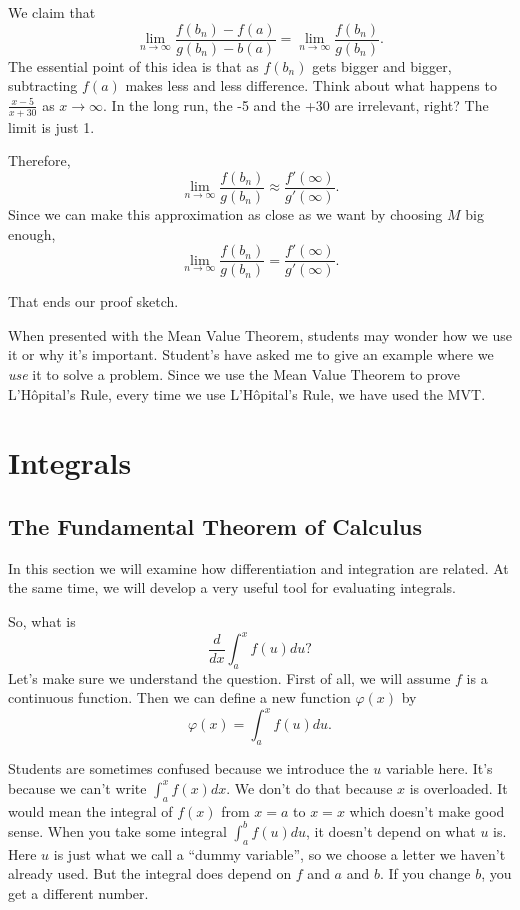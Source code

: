 \documentclass[11pt]{book}
\newcounter{tiein}[chapter]
\numberwithin{example}{chapter}
\begin{document}
We claim that $$\lim_{n\to \infty}\frac{f(b_n)-f(a)}{g(b_n)-b(a)} = \lim_{n\to \infty}\frac{f(b_n)}{g(b_n)}.$$
The essential point of this idea is that as $f(b_n)$ gets bigger and bigger, subtracting $f(a)$ makes less and less difference.  Think about what happens to $\frac{x-5}{x+30}$ as $x\to \infty$.  In the long run, the -5 and the +30 are irrelevant, right?  The limit is just 1. 

Therefore, $$ \lim_{n\to \infty}\frac{f(b_n)}{g(b_n)} \approx \frac{f'(\infty)}{g'(\infty)}.$$  
Since we can make this approximation as close as we want by choosing $M$ big enough, 
$$ \lim_{n\to \infty}\frac{f(b_n)}{g(b_n)} = \frac{f'(\infty)}{g'(\infty)}.$$

That ends our proof sketch.



\begin{tiein}
When presented with the Mean Value Theorem, students may wonder how we use it or why it's important.  Student's have asked me to give an example where we \emph{use} it to solve a problem.  Since we use the Mean Value Theorem to prove L'H\^{o}pital's Rule, every time we use L'H\^{o}pital's Rule, we have used the MVT.  
\end{tiein}

\chapter{Integrals}

\section{The Fundamental Theorem of Calculus}

In this section we will examine how differentiation and integration are related.  At the same time, we will develop a very useful tool for evaluating integrals.

So, what is $$\frac{d}{dx}\int_a^x f(u) du?$$
Let's make sure we understand the question.  First of all, we will assume $f$ is a continuous function.  Then we can define a new function $\varphi(x)$ by 
$$\varphi(x)=\int_a^x f(u) du.$$

Students are sometimes confused because we introduce the $u$ variable here.  It's because we can't write $\int_a^x f(x) dx$.  We don't do that because $x$ is overloaded.  It would mean the integral of $f(x)$ from $x=a$ to $x=x$ which doesn't make good sense.  When you take some integral $\int_a^b f(u) du$, it doesn't depend on what $u$ is.  Here $u$ is just what we call a ``dummy variable'', so we choose a letter we haven't already used.  But the integral does depend on $f$ and $a$ and $b$.  If you change $b$, you get a different number.  
\end{document}
